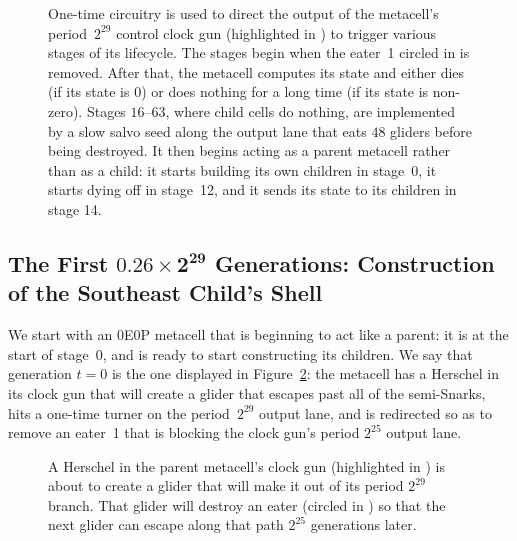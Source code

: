 \begin{figure}[!htbp]
	\centering
	\caption{One-time circuitry is used to direct the output of the metacell's period~$2^{29}$ control clock gun (highlighted in ) to trigger various stages of its lifecycle. The stages begin when the eater~1 circled in  is removed. After that, the metacell computes its state and either dies (if its state is 0) or does nothing for a long time (if its state is non-zero). Stages $16$--$63$, where child cells do nothing, are implemented by a slow salvo seed along the output lane that eats $48$ gliders before being destroyed. It then begins acting as a parent metacell rather than as a child: it starts building its own children in stage~0, it starts dying off in stage~12, and it sends its state to its children in stage 14.}
	\label{fig:0e0p_clock_gun_full}
\end{figure}




\subsection{The First $\mathbf{0.26 \times 2^{29}}$ Generations: Construction of the Southeast Child's Shell}\label{sec:0e0p_timeline_shell}

We start with an 0E0P metacell that is beginning to act like a parent: it is at the start of stage~$0$, and is ready to start constructing its children. We say that generation $t = 0$ is the one displayed in Figure~\ref{fig:0e0p_timeline_0}: the metacell has a Herschel in its clock gun that will create a glider that escapes past all of the semi-Snarks, hits a one-time turner on the period~$2^{29}$ output lane, and is redirected so as to remove an eater~1 that is blocking the clock gun's period $2^{25}$ output lane.

\begin{figure}[!htb]
	\centering
	\caption{A Herschel in the parent metacell's clock gun (highlighted in ) is about to create a glider that will make it out of its period $2^{29}$ branch. That glider will destroy an eater (circled in ) so that the next glider can escape along that path $2^{25}$ generations later.}
	\label{fig:0e0p_timeline_0}
\end{figure}

